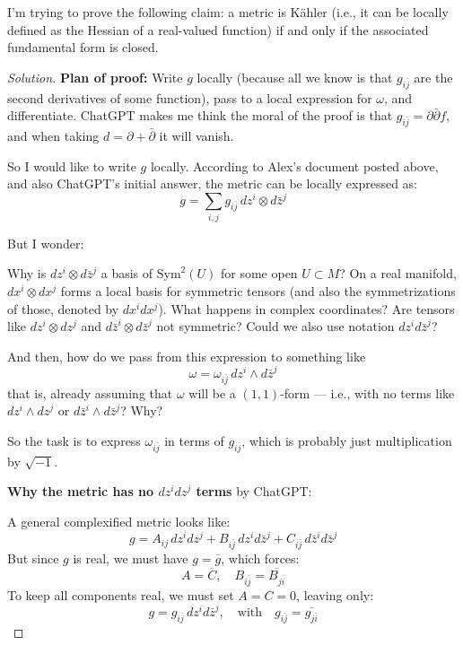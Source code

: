 \begin{exercise}\leavevmode
I’m trying to prove the following claim: a metric is Kähler (i.e., it can be locally defined as the Hessian of a real-valued function) if and only if the associated fundamental form is closed.
\end{exercise}

\begin{proof}[Solution]\leavevmode
\textbf{Plan of proof:} Write \( g \) locally (because all we know is that \( g_{i\bar{j}} \) are the second derivatives of some function), pass to a local expression for \( \omega \), and differentiate. ChatGPT makes me think the moral of the proof is that \( g_{i\bar{j}} = \partial \bar{\partial} f \), and when taking \( d = \partial + \bar{\partial} \) it will vanish.

So I would like to write \( g \) locally. According to Alex’s document posted above, and also ChatGPT’s initial answer, the metric can be locally expressed as:
\[
g = \sum_{i,j} g_{i \bar{j}} \, dz^i \otimes d\bar{z}^j
\]

But I wonder:

Why is \( dz^i \otimes d\bar{z}^j \) a basis of \( \mathrm{Sym}^2(U) \) for some open \( U \subset M \)? On a real manifold, \( dx^i \otimes dx^j \) forms a local basis for symmetric tensors (and also the symmetrizations of those, denoted by \( dx^i dx^j \)). What happens in complex coordinates? Are tensors like \( dz^i \otimes dz^j \) and \( d\bar{z}^i \otimes d\bar{z}^j \) not symmetric? Could we also use notation \( dz^i d\bar{z}^j \)?

And then, how do we pass from this expression to something like
\[
\omega = \omega_{i \bar{j}} \, dz^i \wedge d\bar{z}^j
\]
that is, already assuming that \( \omega \) will be a \((1,1)\)-form — i.e., with no terms like \( dz^i \wedge dz^j \) or \( d\bar{z}^i \wedge d\bar{z}^j \)? Why?

So the task is to express \( \omega_{i \bar{j}} \) in terms of \( g_{i \bar{j}} \), which is probably just multiplication by \( \sqrt{-1} \).

\bigskip

\textbf{Why the metric has no \( dz^i dz^j \) terms} by ChatGPT:

A general complexified metric looks like:
\[
g = A_{ij} \, dz^i dz^j + B_{i\bar{j}} \, dz^i d\bar{z}^j + C_{\bar{i} \bar{j}} \, d\bar{z}^i d\bar{z}^j
\]
But since \( g \) is real, we must have \( g = \overline{g} \), which forces:
\[
A = \overline{C}, \quad B_{i\bar{j}} = \overline{B_{j\bar{i}}}
\]
To keep all components real, we must set \( A = C = 0 \), leaving only:
\[
g = g_{i\bar{j}} \, dz^i d\bar{z}^j, \quad \text{with} \quad g_{i\bar{j}} = \overline{g_{j\bar{i}}}
\]
\end{proof}

